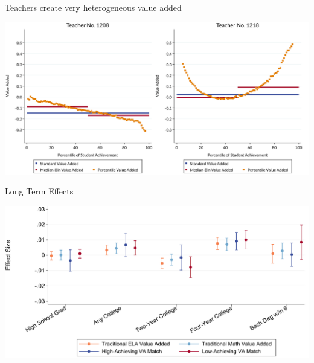 \documentclass[t,aspectratio=169,11pt]{beamer}
\begin{document}
\begin{frame}[label=het1,c]{Teachers create very heterogeneous value added}



\begin{center}
\includegraphics[width=.85\textwidth]{slides/slides_pffls/fig1_heterogeneity.pdf}
\end{center}

\hyperlink{example}{}
\end{frame}



\begin{frame}[c]{Long Term Effects}
\begin{center}



\includegraphics[width=.85\textwidth]{slides/Figures/fig2b_longterm.pdf}
\end{center}

\end{frame}
\end{document}

